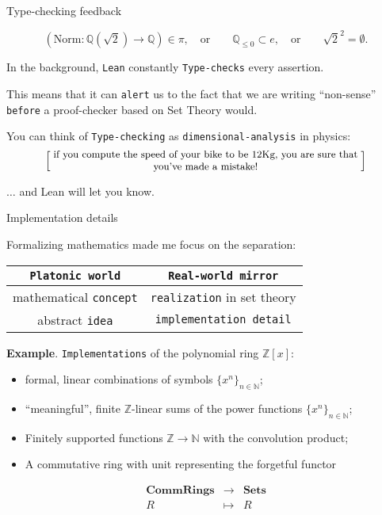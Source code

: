 \documentclass{beamer}
\begin{document}
\begin{frame}[fragile]{Type-checking feedback}

$$
  \left(
    {\textrm{Norm}} \colon \mathbb{Q}\left( \sqrt{2} \right) \to \mathbb{Q}
  \right) \in \pi,
  \quad {\textrm{or}} \qquad
  \mathbb{Q}_{\le 0} \subset e,
  \quad {\textrm{or}} \qquad
  \sqrt{2} ^ 2 = \emptyset.
$$

In the background, {\color{violet}\verb`Lean`} constantly {\color{violet}\verb`Type-checks`} every assertion.

This means that it can {\color{violet}\verb`alert`} us to the fact that we are writing ``non-sense'' {\color{violet}\verb`before`} a proof-checker based on Set Theory would.

You can think of {\color{violet}\verb`Type-checking`} as {\color{violet}\verb`dimensional-analysis`} in physics:
\[
  \left[ \;
  \parbox{0.8\textwidth}{\centering\small
  if you compute the speed of your bike to be $12$Kg, you are sure that you've made a mistake!
  }
  \; \right]
\]

$\ldots$ and Lean will let you know.
\end{frame}

\begin{frame}[fragile]{Implementation details}

Formalizing mathematics made me focus on the separation:

{\centering
\begin{tabular}{|c|c|}
\hline
{\color{violet}\verb`Platonic world`} &  {\color{violet}\verb`Real-world mirror`}  \\
\hline
mathematical {\color{violet}\verb`concept`} & {\color{violet}\verb`realization`} in set theory \\
abstract {\color{violet}\verb`idea`}        & {\color{violet}\verb`implementation detail`} \\
\hline
\end{tabular}

}

{\textbf{Example}}. {\color{violet}\verb`Implementations`} of the polynomial ring $\mathbb{Z}[x]$:
\\
\vspace{-13pt}
\begin{itemize}
\setlength\itemsep{-12pt}
\item
  formal, linear combinations of symbols $\{ x^n \}_{n \in \mathbb{N}}$;
\item
  ``meaningful'', finite $\mathbb{Z}$-linear sums of the power functions $\{ x^n \}_{n \in \mathbb{N}}$;
\item
  Finitely supported functions $\mathbb{Z} \to \mathbb{N}$ with the convolution product;
\item
  A commutative ring with unit representing the forgetful functor
\end{itemize}
$$
  \begin{array}{rcl}
    {\textbf{CommRings}} & \longrightarrow & {\textbf{Sets}} \\
    R & \longmapsto & R
  \end{array}
$$
\end{frame}
\end{document}
